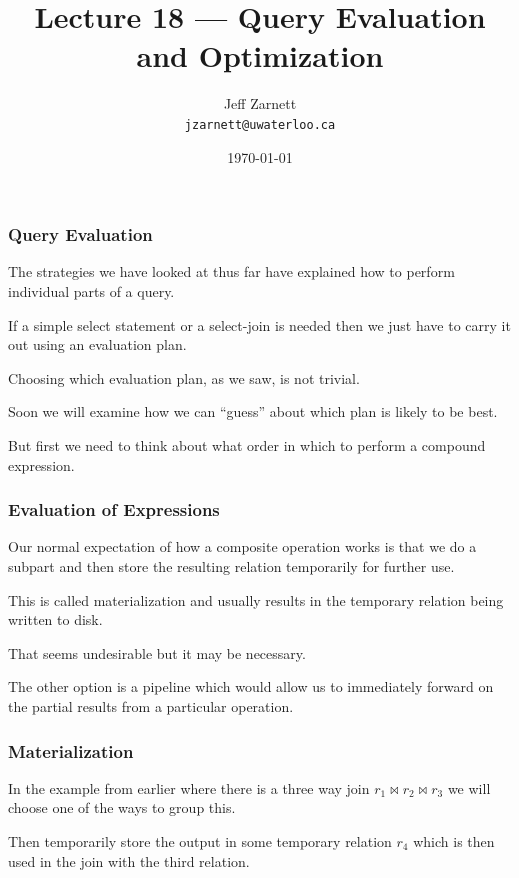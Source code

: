 

\title{Lecture 18 --- Query Evaluation and Optimization}

\author{Jeff Zarnett \\ \small \texttt{jzarnett@uwaterloo.ca}}
\date{\today}




\begin{frame}
  \titlepage

 \end{frame}
 
\begin{frame}
\frametitle{Query Evaluation}

The strategies we have looked at thus far have explained how to perform individual parts of a query. 

If a simple select statement or a select-join is needed then we just have to carry it out using an evaluation plan. 

Choosing which evaluation plan, as we saw, is not trivial. 

Soon we will examine how we can ``guess'' about which plan is likely to be best. 

But first we need to think about what order in which to perform a compound expression.

\end{frame}

\begin{frame}
\frametitle{Evaluation of Expressions}

Our normal expectation of how a composite operation works is that we do a subpart and then store the resulting relation temporarily for further use.

This is called \alert{materialization} and usually results in the temporary relation being written to disk. 

That seems undesirable but it may be necessary. 

The other option is a \alert{pipeline} which would allow us to immediately forward on the partial results from a particular operation.


\end{frame}

\begin{frame}
\frametitle{Materialization}

In the example from earlier where there is a three way join $r_{1} \bowtie r_{2} \bowtie r_{3}$ we will choose one of the ways to group this.

Then temporarily store the output in some temporary relation $r_{4}$ which is then used in the join with the third relation. 

\end{frame}

